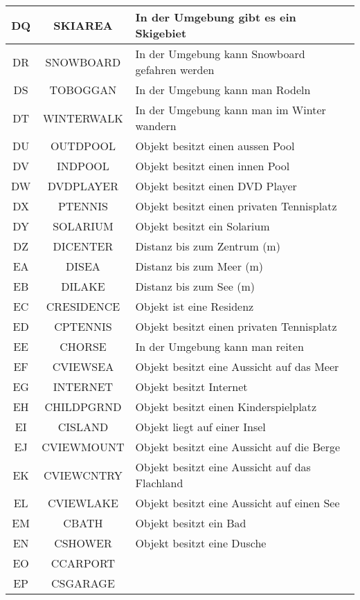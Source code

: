 \begin{longtable}{ | c | c | L{10cm} |}
	DQ & SKIAREA & In der Umgebung gibt es ein Skigebiet \\ \hline 
	DR & SNOWBOARD & In der Umgebung kann Snowboard gefahren werden \\ \hline 
	DS & TOBOGGAN & In der Umgebung kann man Rodeln \\ \hline 
	DT & WINTERWALK & In der Umgebung kann man im Winter wandern \\ \hline 
	DU & OUTDPOOL & Objekt besitzt einen aussen Pool \\ \hline 
	DV & INDPOOL & Objekt besitzt einen innen Pool \\ \hline 
	DW & DVDPLAYER & Objekt besitzt einen DVD Player \\ \hline 
	DX & PTENNIS & Objekt besitzt einen privaten Tennisplatz \\ \hline 
	DY & SOLARIUM & Objekt besitzt ein Solarium \\ \hline 
	DZ & DICENTER & Distanz bis zum Zentrum (m) \\ \hline 
	EA & DISEA & Distanz bis zum Meer (m) \\ \hline 
	EB & DILAKE & Distanz bis zum See (m) \\ \hline 
	EC & CRESIDENCE & Objekt ist eine Residenz \\ \hline 
	ED & CPTENNIS & Objekt besitzt einen privaten Tennisplatz \\ \hline 
	EE & CHORSE & In der Umgebung kann man reiten \\ \hline 
	EF & CVIEWSEA & Objekt besitzt eine Aussicht auf das Meer \\ \hline 
	EG & INTERNET & Objekt besitzt Internet \\ \hline 
	EH & CHILDPGRND & Objekt besitzt einen Kinderspielplatz \\ \hline 
	EI & CISLAND & Objekt liegt auf einer Insel \\ \hline 
	EJ & CVIEWMOUNT & Objekt besitzt eine Aussicht auf die Berge \\ \hline 
	EK & CVIEWCNTRY & Objekt besitzt eine Aussicht auf das Flachland \\ \hline 
	EL & CVIEWLAKE & Objekt besitzt eine Aussicht auf einen See \\ \hline 
	EM & CBATH & Objekt besitzt ein Bad \\ \hline 
	EN & CSHOWER & Objekt besitzt eine Dusche \\ \hline 
	EO & CCARPORT &  \\ \hline 
	EP & CSGARAGE &  \\ \hline 

\end{longtable}
